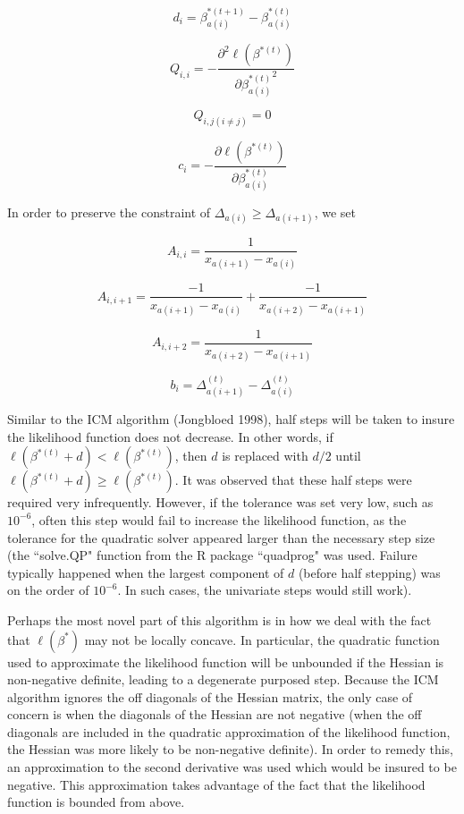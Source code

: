 	\[ d_i = \beta^{*(t+1)}_{a(i)} - \beta^{*(t)}_{a(i)}
	\]
	
	\[Q_{i,i} = - \frac{\partial^2 \ell(\beta^{*(t)} )} {\partial {\beta^{*(t)}_{a(i)}}^2}
	\]
	 
	 \[
	 Q_{i,j (i\neq j)} = 0
	 \]
	 
	\[c_i = -\frac{\partial \ell(\beta^{*(t)})} {\partial \beta_{a(i)}^{*(t)} }
	\]
	
	In order to preserve the constraint of $\Delta_{a(i)} \geq \Delta_{a(i+1)}$, we set 
	
	\[ A_{i,i} = \frac{1}{x_{a(i+1)} - x_{a(i)} }
	\]
	
	\[ A_{i, i + 1} = \frac{-1}{x_{a(i+1)} - x_{a(i)} } + \frac{-1}{x_{a(i+2)} - x_{a(i + 1)} }
	\]
	
	\[ A_{i, i + 2} = \frac{1}{x_{a(i+2)} - x_{a(i + 1)} }
	\]
	
	\[ b_i =\Delta_{a(i + 1)}^{(t)} - \Delta_{a(i)}^{(t)}
	\]
	
	Similar to the ICM algorithm (Jongbloed 1998), half steps will be taken to insure the likelihood function does not decrease. In other words, if $\ell ( \beta^{*(t)} + d ) < \ell ( \beta^{*(t)}  ) $, then $d$ is replaced with $d/2$ until $\ell ( \beta^{*(t)} + d ) \geq \ell ( \beta^{*(t)} )$. It was observed that these half steps were required very infrequently. However, if the tolerance was set very low, such as $10^{-6}$, often this step would fail to increase the likelihood function, as the tolerance for the quadratic solver appeared larger than the necessary step size (the ``solve.QP" function from the R package ``quadprog" was used. Failure typically happened when the largest component of $d$ (before half stepping) was on the order of $10^{-6}$. In such cases, the univariate steps would still work). 
	
	Perhaps the most novel part of this algorithm is in how we deal with the fact that $\ell(\beta^*)$ may not be locally concave. In particular, the quadratic function used to approximate the likelihood function will be unbounded if the Hessian is non-negative definite, leading to a degenerate purposed step. Because the ICM algorithm ignores the off diagonals of the Hessian matrix, the only case of concern is when the diagonals of the Hessian are not negative (when the off diagonals are included in the quadratic approximation of the likelihood function, the Hessian was more likely to be non-negative definite). In order to remedy this, an approximation to the second derivative was used which would be insured to be negative. This approximation takes advantage of the fact that the likelihood function is bounded from above. 
		
